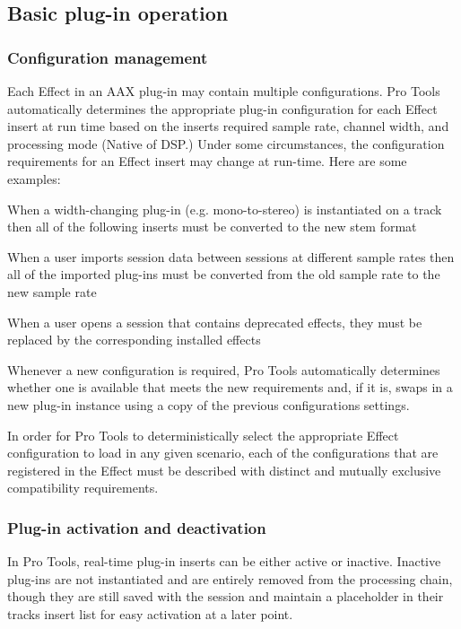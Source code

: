 \hypertarget{a00830_aax_pro_tools_guide_04_basic_plugin_operation}{}\subsection{Basic plug-\/in operation}\label{a00830_aax_pro_tools_guide_04_basic_plugin_operation}
\hypertarget{a00830_subsection__configuration_management}{}\subsubsection{Configuration management}\label{a00830_subsection__configuration_management}
Each Effect in an A\+AX plug-\/in may contain multiple configurations. Pro Tools automatically determines the appropriate plug-\/in configuration for each Effect insert at run time based on the insert\textquotesingle{}s required sample rate, channel width, and processing mode (Native of D\+SP.) Under some circumstances, the configuration requirements for an Effect insert may change at run-\/time. Here are some examples\+: 
\begin{DoxyItemize}
\item When a width-\/changing plug-\/in (e.\+g. mono-\/to-\/stereo) is instantiated on a track then all of the following inserts must be converted to the new stem format  
\item When a user imports session data between sessions at different sample rates then all of the imported plug-\/ins must be converted from the old sample rate to the new sample rate  
\item When a user opens a session that contains deprecated effects, they must be replaced by the corresponding installed effects  
\end{DoxyItemize}

Whenever a new configuration is required, Pro Tools automatically determines whether one is available that meets the new requirements and, if it is, swaps in a new plug-\/in instance using a copy of the previous configuration\textquotesingle{}s settings.

In order for Pro Tools to deterministically select the appropriate Effect configuration to load in any given scenario, each of the configurations that are registered in the Effect must be described with distinct and mutually exclusive compatibility requirements.

\hypertarget{a00830_subsection__plugin_activation_and_deactivation}{}\subsubsection{Plug-\/in activation and deactivation}\label{a00830_subsection__plugin_activation_and_deactivation}
 In Pro Tools, real-\/time plug-\/in inserts can be either active or inactive. Inactive plug-\/ins are not instantiated and are entirely removed from the processing chain, though they are still saved with the session and maintain a placeholder in their track\textquotesingle{}s insert list for easy activation at a later point.

